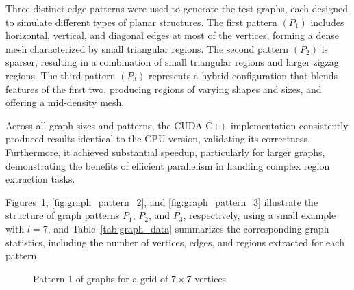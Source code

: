 Three distinct edge patterns were used to generate the test graphs, each designed to simulate different types of planar structures. The first pattern \((P_1)\) includes horizontal, vertical, and diagonal edges at most of the vertices, forming a dense mesh characterized by small triangular regions. The second pattern \((P_2)\) is sparser, resulting in a combination of small triangular regions and larger zigzag regions. The third pattern \((P_3)\) represents a hybrid configuration that blends features of the first two, producing regions of varying shapes and sizes, and offering a mid-density mesh.

Across all graph sizes and patterns, the CUDA C++ implementation consistently produced results identical to the CPU version, validating its correctness. Furthermore, it achieved substantial speedup, particularly for larger graphs, demonstrating the benefits of efficient parallelism in handling complex region extraction tasks.

Figures~\ref{fig:graph_pattern_1}, \ref{fig:graph_pattern_2}, and \ref{fig:graph_pattern_3} illustrate the structure of graph patterns \(P_1\), \(P_2\), and \(P_3\), respectively, using a small example with \(l = 7\), and Table~\ref{tab:graph_data} summarizes the corresponding graph statistics, including the number of vertices, edges, and regions extracted for each pattern.

\begin{figure}
    \centering
    \caption{Pattern 1 of graphs for a grid of \(7 \times 7\) vertices}
    \label{fig:graph_pattern_1}
\end{figure}


